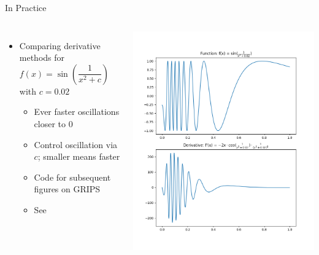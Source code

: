\begin{frame}[fragile]{In Practice}
%
\begin{columns}
\begin{itemize}
\item Comparing derivative methods for $f(x) = \sin(\dfrac{1}{x^2 + c})$ with $c = 0.02$
	\begin{itemize}
	\item Ever faster oscillations closer to 0
	\item Control oscillation via $c$; smaller means faster
	\item Code for subsequent figures on GRIPS
	\item See 
	\end{itemize}
\end{itemize}
%
\includegraphics[width=\linewidth]{./gfx/03-derivative-functions}
\end{columns}
%
\end{frame}


